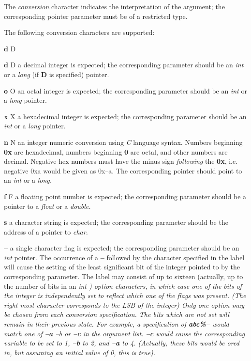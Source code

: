 The
{\it conversion}
character indicates the interpretation of the argument; the corresponding
pointer parameter must be of a restricted type.
\par
The following conversion characters are supported:
\begin{TPlist}{{\bf d} D}
\item[{{\bf d} D}]
a decimal integer is expected; the corresponding parameter should be an 
{\it int}
or a
{\it long}
(if
{\bf D}
is specified) pointer.
\item[{{\bf o} O}]
an octal integer is expected; the corresponding parameter should be an 
{\it int}
or a
{\it long}
pointer.
\item[{{\bf x} X}]
a hexadecimal integer is expected; the corresponding parameter should be an 
{\it int}
or a
{\it long}
pointer.
\item[{{\bf n} N}]
an integer numeric conversion using 
{\it C}
language syntax.  Numbers beginning 
{\bf 0x}
are hexadecimal, numbers beginning
{\bf 0}
are octal, and other numbers are decimal.  Negative hex numbers must have
the minus sign
{\it following}
the
{\bf 0x}{\rm ,}
i.e. negative 0xa would be given as 0x--a.  The corresponding pointer
should point to an
{\it int}
or a
{\it long.}
\item[{{\bf f} F}]
a floating point number is expected; the corresponding parameter should
be a pointer to a
{\it float}
or a
{\it double.}
\item[{{\bf s}}]
a character string is expected; the corresponding parameter should be the
address of a pointer to
{\it char.}
\item[{{\bf --}}]
a single character flag is expected; the corresponding parameter should
be an 
{\it int}
pointer.  The occurrence of a
{\bf --}
followed by the character specified in the label
will cause the setting of the least significant bit of the integer pointed to 
by the corresponding parameter.  The label may consist of up to sixteen
(actually, up to the number of bits in an %
\it int\rm%
) option
characters, in which case one of the bits of the integer is independently
set to reflect which one of the flags was present. (The right most character
corresponds to the LSB of the integer)  Only one option may be chosen from
each conversion specification.  The bits which are not set will remain in
their previous state.  For example, a specification of 
{\bf abc\%--}
would match one of
{\bf --a} --b
or
{\bf --c}
in the argument list. 
{\bf --c}
would cause the corresponding variable to be set to 1, 
{\bf --b}
to 2, and
{\bf --a}
to 4.  (Actually, these bits would be ored in, but assuming an initial value
of 0, this is true).
\end{TPlist}\par
